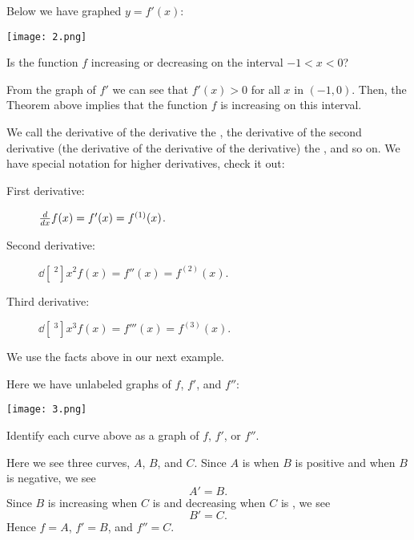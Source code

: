 \documentclass{ximera}
\begin{document}
\begin{question}
  Below we have graphed $y=f'(x)$:
  \begin{image}
    \texttt{[image: 2.png]}
  \end{image}
  Is the function $f$ increasing or decreasing on
  the interval $-1<x<0$?
  \begin{prompt}
    \begin{multipleChoice}
    \end{multipleChoice}
  \end{prompt}
  \begin{explanation} From the graph of  $f'$ we can see that $f'(x)>0$ for all $x$ in $(-1,0)$. Then, the Theorem above implies that the function $f$ is increasing on this interval.
      \end{explanation}
\end{question}

We call the derivative of the derivative the , the derivative of the second derivative (the derivative of the derivative of the derivative) the
, and so on. We have special notation for
higher derivatives, check it out:
\begin{description}
\item[First derivative:] $\frac{d}{\mathop{}\!d x} f(x) = f'(x) = f^{(1)}(x)$.
\item[Second derivative:] $\dd[~^2]{x^2} f(x) = f''(x) = f^{(2)}(x)$.
\item[Third derivative:] $\dd[~^3]{x^3} f(x) = f'''(x) = f^{(3)}(x)$.
\end{description}

We use the facts above in our next example.

\begin{example}
  Here we have unlabeled graphs of $f$, $f'$, and $f''$:
  \begin{image}
    \texttt{[image: 3.png]}
  \end{image}
  Identify each curve above as a graph of $f$, $f'$, or $f''$.
  \begin{explanation} 
    Here we see three curves, $A$, $B$, and $C$. Since $A$ is
     when $B$ is
    positive and
    when $B$ is negative, we see
    \[
    A'=B.
    \]
    Since $B$ is increasing when $C$ is
     and decreasing when $C$ is
    , we see
    \[
    B'=C.
    \]
    Hence $f=A$, $f'=B$, and $f''=C$.
  \end{explanation}
\end{example}
\end{document}
